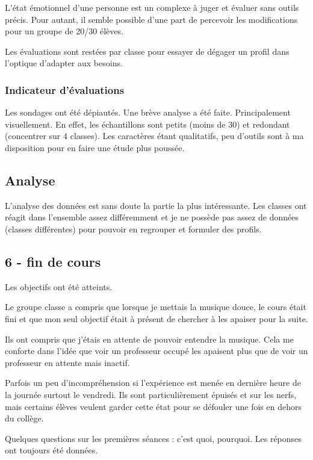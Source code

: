 \documentclass[11pt]{article}
\begin{document}
	L'état émotionnel d'une personne est un complexe à juger et évaluer sans outils précis. Pour autant, il semble possible d'une part de percevoir les modifications pour un groupe de 20/30 élèves. 
	
	Les évaluations sont restées par classe pour essayer de dégager un profil dans l'optique d'adapter aux besoins.
	
	\subsubsection{Indicateur d'évaluations}
	
	Les sondages ont été dépiautés. Une brève analyse a été faite. Principalement visuellement. En effet, les échantillons sont petits (moins de 30) et redondant (concentrer sur 4 classes). Les caractères étant qualitatifs, peu d'outils sont à ma disposition pour en faire une étude plus poussée.
	
	\subsection{Analyse}
	
	L'analyse des données est sans doute la partie la plus intéressante. Les classes ont réagit dans l'ensemble assez différemment et je ne possède pas assez de données (classes différentes) pour pouvoir en regrouper et formuler des profils.
	
	\subsection{6 - fin de cours}
	Les objectifs ont été atteints.
	
	Le groupe classe a compris que lorsque je mettais la musique douce, le cours était fini et que mon seul objectif était à présent de chercher à les apaiser pour la suite. 
	
	Ils ont compris que j'étais en attente de pouvoir entendre la musique. Cela me conforte dans l'idée que voir un professeur occupé les apaisent plus que de voir un professeur en attente mais inactif. 
	
	Parfois un peu d'incompréhension si l'expérience est menée en dernière heure de la journée surtout le vendredi. Ils sont particulièrement épuisés et sur les nerfs, mais certains élèves veulent garder cette état pour se défouler une fois en dehors du collège.
	
	Quelques questions sur les premières séances : c'est quoi, pourquoi. Les réponses ont toujours été données.
	
\end{document}
